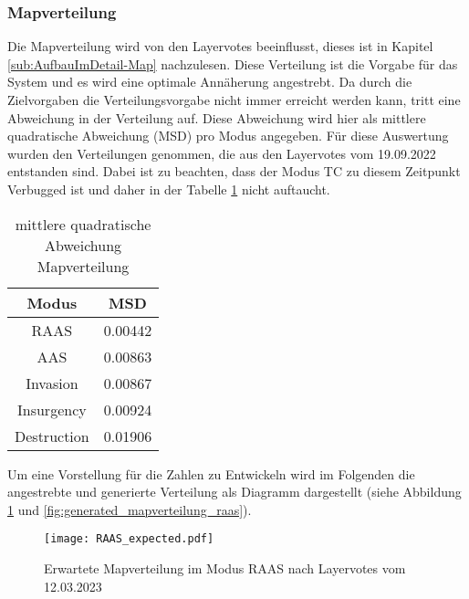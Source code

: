         \subsubsection{Mapverteilung}
            Die Mapverteilung wird von den Layervotes beeinflusst, dieses ist in Kapitel \ref{sub:AufbauImDetail-Map} nachzulesen.
            Diese Verteilung ist die Vorgabe für das System und es wird eine optimale Annäherung angestrebt. Da durch die
            Zielvorgaben die Verteilungsvorgabe nicht immer erreicht werden kann, tritt eine Abweichung in der Verteilung auf.
            Diese Abweichung wird hier als mittlere quadratische Abweichung (MSD) pro Modus angegeben.
            Für diese Auswertung wurden den Verteilungen genommen, die aus den Layervotes vom 19.09.2022 entstanden sind.
            Dabei ist zu beachten, dass der Modus TC zu diesem Zeitpunkt \glqq{}Verbugged\grqq{} ist und daher
            in der Tabelle \ref{t:Ergebnisse:fehler_Mapverteilung} nicht auftaucht.\\
            \begin{table}[h]
                \centering
                \begin{tabular}{|| c c ||}
                    \hline
                    Modus & MSD \\
                    \hline
                    \hline
                    RAAS & 0.00442 \\ %
                    \hline
                    AAS & 0.00863 \\ %
                    \hline
                    Invasion & 0.00867 \\ %
                    \hline
                    Insurgency & 0.00924 \\ %
                    \hline
                    Destruction & 0.01906 \\ %
                    \hline
                \end{tabular}
                \caption{mittlere quadratische Abweichung Mapverteilung}
                \label{t:Ergebnisse:fehler_Mapverteilung}
            \end{table}

            Um eine Vorstellung für die Zahlen zu Entwickeln wird im Folgenden die angestrebte und generierte Verteilung als
            Diagramm dargestellt (siehe Abbildung \ref{fig:expected_mapverteilung_raas}
            und \ref{fig:generated_mapverteilung_raas}).

            \begin{figure}[htbp]
                \centering
                \texttt{[image: RAAS\_expected.pdf]}
                \caption{Erwartete Mapverteilung im Modus RAAS nach Layervotes vom 12.03.2023}
                \label{fig:expected_mapverteilung_raas}
            \end{figure}

